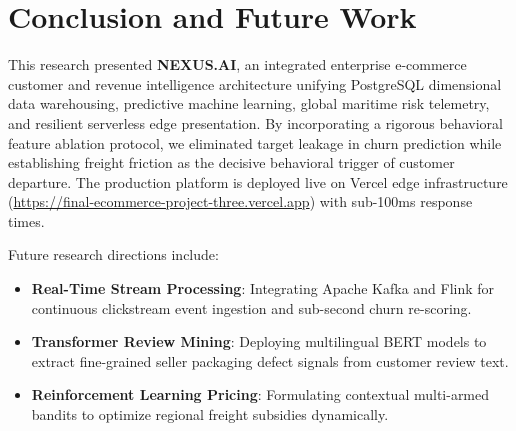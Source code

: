 \documentclass[conference]{IEEEtran}
\begin{document}
\section{Conclusion and Future Work}
This research presented \textbf{NEXUS.AI}, an integrated enterprise e-commerce customer and revenue intelligence architecture unifying PostgreSQL dimensional data warehousing, predictive machine learning, global maritime risk telemetry, and resilient serverless edge presentation. By incorporating a rigorous behavioral feature ablation protocol, we eliminated target leakage in churn prediction while establishing freight friction as the decisive behavioral trigger of customer departure. The production platform is deployed live on Vercel edge infrastructure (\url{https://final-ecommerce-project-three.vercel.app}) with sub-100ms response times.

Future research directions include:
\begin{itemize}
    \item \textbf{Real-Time Stream Processing}: Integrating Apache Kafka and Flink for continuous clickstream event ingestion and sub-second churn re-scoring.
    \item \textbf{Transformer Review Mining}: Deploying multilingual BERT models to extract fine-grained seller packaging defect signals from customer review text.
    \item \textbf{Reinforcement Learning Pricing}: Formulating contextual multi-armed bandits to optimize regional freight subsidies dynamically.
\end{itemize}
\end{document}
